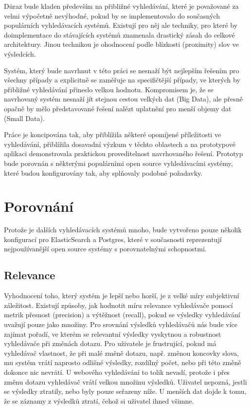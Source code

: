 \documentclass[11pt,letterpaper,oneside,openright]{book}
\begin{document}
Důraz bude kladen především na přibližné vyhledávání, které je považované za
velmi výpočetně nevýhodné, pokud by se implementovalo do současných populárních
vyhledávacích systémů. Existují pro něj ale techniky, pro které by
doimplementace do stávajících systémů znamenala drastický zásah do celkové
architektury. Jinou technikou je ohodnocení podle blízkosti (proximity) slov ve
výsledcích.

Systém, který bude navrhnut v této práci se nesnaží být nejlepším řešením pro
všechny případy a explicitně se zaměřuje na specifičtější případy, ve kterých
by přibližné vyhledávání přineslo velkou hodnotu. Kompromisem je, že se
navrhovaný systém nesnaží jít stejnou cestou velkých dat (Big Data), ale přesně
opačně by mělo představované řešení nalézt uplatnění pro menší objemy dat
(Small Data).

Práce je koncipována tak, aby přiblížila některé opomíjené příležitosti ve
vyhledávání, přiblížila dosavadní výzkum v těchto oblastech a na prototypové
aplikaci demonstrovala praktickou proveditelnost navrhovaného řešení. Prototyp
bude porovnán s některými populárními open source vyhledávacími systémy, které
budou konfigurovány tak, aby splňovaly podobné požadavky.


\section{Porovnání}
Protože je dalších vyhledávacích systémů mnoho, bude vytvořeno pouze několik
konfigurací pro ElasticSearch a Postgres, které v současnosti reprezentují
nejpoužívanější open source systémy s porovnatelnými schopnostmi.

\subsection{Relevance}
Vyhodnocení toho, který systém je lepší nebo horší, je z velké míry subjektivní
záležitost. Existují způsoby, jak hodnotit míru relevance vyhledávače pomocí
metrik přesnost (precision) a výtěžnost (recall), pokud se výsledky vyhledávání
uvažují pouze jako množiny. Pro srovnání výsledků vyhledávačů nás bude více
zajímat pořadí, ve kterém se relevantní výsledky vyskytnou a robustnost
vyhledávače při změnách dotazu. Pro uživatele je frustrující, pokud má
vyhledávač vlastnost, že při malé změně dotazu, např.  změnou koncovky slova,
mu systém vrátí naprosto odlišné výsledky, rozdílný počet, nebo při této změně
dokonce nic nevrátí. U webového vyhledávání to tolik nevadí, protože i přes
změnu dotazu vyhledávač vrátí velkou množinu výsledků.  Uživatel nepozná,
jestli se výsledky ztratily, nebo byly pouze seřazeny níže. U menších dat dojde
k tomu, že se záznamy z výsledků ztratí, čehož si uživatel ihned všimne.
\end{document}
